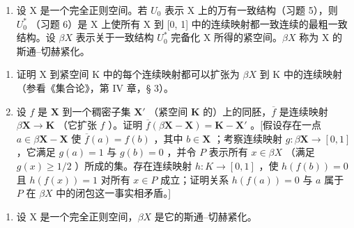 \begin{enumerate}
\def\labelenumi{\arabic{enumi})}
\setcounter{enumi}{6}
\tightlist
\item
  设 X 是一个完全正则空间。若 \(U_{0}\) 表示 X 上的万有一致结构（习题 5），则 \(U_{0}^{*}\) （习题 6）是 X 上使所有 X 到 {[}0, 1{]} 中的连续映射都一致连续的最粗一致结构。设 \(\beta X\) 表示关于一致结构 \(U_{0}^{*}\) 完备化 X 所得的紧空间。\(\beta X\) 称为 X 的斯通–切赫紧化。
\end{enumerate}

\begin{enumerate}
\def\labelenumi{\alph{enumi})}
\item
  证明 X 到紧空间 K 中的每个连续映射都可以扩张为 \(\beta X\) 到 K 中的连续映射（参看《集合论》，第 IV 章，§ 3）。
\item
  设 \(f\) 是 \(\mathbf{X}\) 到一个稠密子集 \(\mathbf{X}'\) （紧空间 \(\mathbf{K}\) 的）上的同胚，\(\overline{f}\) 是连续映射 \(\beta \mathbf{X} \to \mathbf{K}\) （它扩张 \(f\) ）。证明 \(\overline{f}(\beta \mathbf{X} - \mathbf{X}) = \mathbf{K} - \mathbf{X}'\) 。{[}假设存在一点 \(a \in \beta \mathbf{X} - \mathbf{X}\) 使 \(\overline{f}(a) = f(b)\) ，其中 \(b \in \mathbf{X}\) ；考察连续映射 \(g: \beta \mathbf{X} \to [0, 1]\) ，它满足 \(g(a) = 1\) 与 \(g(b) = 0\) ，并令 \(P\) 表示所有 \(x \in \beta X\) （满足 \(g(x) \geqslant 1/2\) ）所成的集。存在连续映射 \(h: K \to [0, 1]\) ，使 \(h(f(b)) = 0\) 且 \(h(f(x)) = 1\) 对所有 \(x \in P\) 成立；证明关系 \(h(f(a)) = 0\) 与 \(a\) 属于 \(P\) 在 \(\beta X\) 中的闭包这一事实相矛盾。{]}
\end{enumerate}

\begin{enumerate}
\def\labelenumi{\arabic{enumi})}
\setcounter{enumi}{7}
\tightlist
\item
  设 X 是一个完全正则空间，\(\beta X\) 是它的斯通–切赫紧化。
\end{enumerate}

